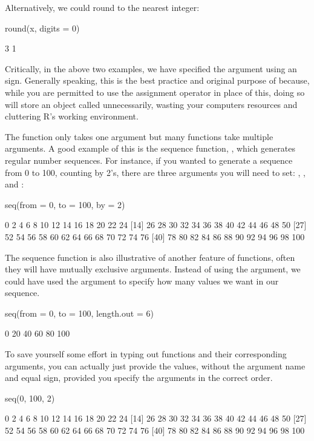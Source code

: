 \noindent
Alternatively, we could round to the nearest integer:
\begin{inR}
round(x, digits = 0)
\end{inR}
\begin{outR}
[1] 3 1
\end{outR}

Critically, in the above two examples, we have specified the  argument using an \R{=} sign. Generally speaking, this is the best practice and original purpose of \R{=} because, while you are permitted to use the assignment operator \R{<-} in place of this, doing so will store an object called  unnecessarily, wasting your computers resources and cluttering R's working environment. 

The  function only takes one argument but many functions take multiple arguments.  A good example of this is the sequence function, , which generates regular number sequences.  For instance, if you wanted to generate a sequence from 0 to 100, counting by 2's, there are three arguments you will need to set: , , and :

\begin{inR}
seq(from = 0, to = 100, by = 2)
\end{inR}
\begin{outR}
 [1]   0   2   4   6   8  10  12  14  16  18  20  22  24
[14]  26  28  30  32  34  36  38  40  42  44  46  48  50
[27]  52  54  56  58  60  62  64  66  68  70  72  74  76
[40]  78  80  82  84  86  88  90  92  94  96  98 100
\end{outR}

The sequence function is also illustrative of another feature of functions, often they will have mutually exclusive arguments. Instead of using the  argument, we could have used the  argument to specify how many values we want in our sequence.

\begin{inR}
seq(from = 0, to = 100, length.out = 6)
\end{inR}
\begin{outR}
[1]   0  20  40  60  80 100
\end{outR}

To save yourself some effort in typing out functions and their corresponding arguments, you can actually just provide the values, without the argument name and equal sign, provided you specify the arguments in the correct order.

\begin{inR}
seq(0, 100, 2)
\end{inR}
\begin{outR}
 [1]   0   2   4   6   8  10  12  14  16  18  20  22  24
[14]  26  28  30  32  34  36  38  40  42  44  46  48  50
[27]  52  54  56  58  60  62  64  66  68  70  72  74  76
[40]  78  80  82  84  86  88  90  92  94  96  98 100
\end{outR}


